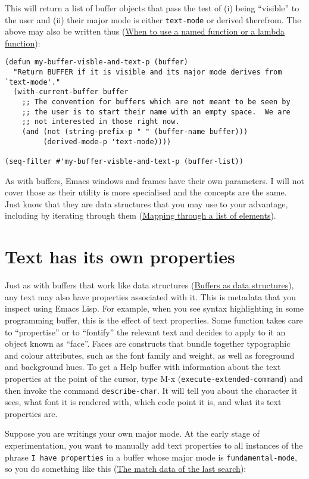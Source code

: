 \documentclass[11pt]{ctexart}
\begin{document}
This will return a list of buffer objects that pass the test of (i) being ``visible'' to the user and (ii) their major mode is either \texttt{text-mode} or derived therefrom. The above may also be written thus (\hyperref[sec:org1669468]{When to use a named function or a lambda function}):

\begin{verbatim}
(defun my-buffer-visble-and-text-p (buffer)
  "Return BUFFER if it is visible and its major mode derives from `text-mode'."
  (with-current-buffer buffer
    ;; The convention for buffers which are not meant to be seen by
    ;; the user is to start their name with an empty space.  We are
    ;; not interested in those right now.
    (and (not (string-prefix-p " " (buffer-name buffer)))
         (derived-mode-p 'text-mode))))

(seq-filter #'my-buffer-visble-and-text-p (buffer-list))
\end{verbatim}

As with buffers, Emacs windows and frames have their own parameters. I will not cover those as their utility is more specialised and the concepts are the same. Just know that they are data structures that you may use to your advantage, including by iterating through them (\hyperref[sec:org29370c2]{Mapping through a list of elements}).
\section{Text has its own properties}
\label{sec:orgcf4e6e5}
Just as with buffers that work like data structures (\hyperref[sec:org426ce04]{Buffers as data structures}), any text may also have properties associated with it. This is metadata that you inspect using Emacs Lisp. For example, when you see syntax highlighting in some programming buffer, this is the effect of text properties. Some function takes care to ``propertise'' or to ``fontify'' the relevant text and decides to apply to it an object known as ``face''. Faces are constructs that bundle together typographic and colour attributes, such as the font family and weight, as well as foreground and background hues. To get a Help buffer with information about the text properties at the point of the cursor, type M-x (\texttt{execute-extended-command}) and then invoke the command \texttt{describe-char}. It will tell you about the character it sees, what font it is rendered with, which code point it is, and what its text properties are.

Suppose you are writings your own major mode. At the early stage of experimentation, you want to manually add text properties to all instances of the phrase \texttt{I have properties} in a buffer whose major mode is \texttt{fundamental-mode}, so you do something like this (\hyperref[sec:orge641c75]{The match data of the last search}):
\end{document}
